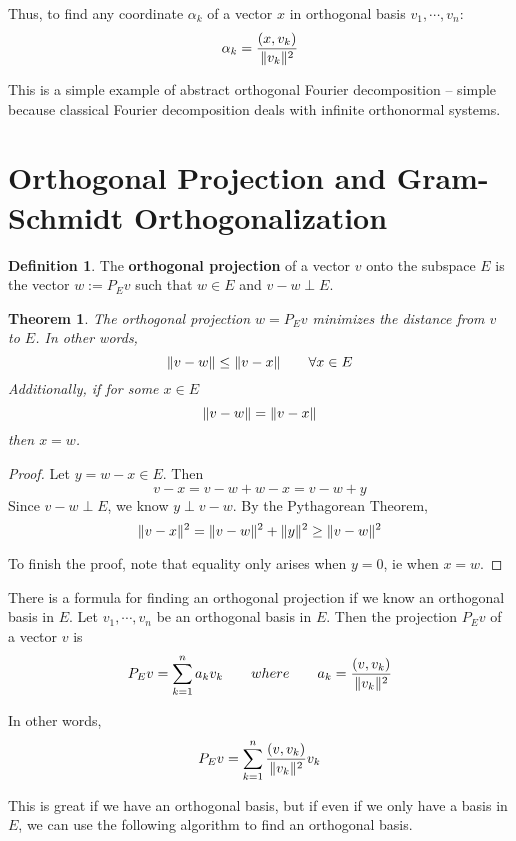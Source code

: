\documentclass[a4paper,10pt]{book}
\DeclarePairedDelimiter{\norm}{\lVert}{\rVert}
\theoremstyle{plain}
\newtheorem{theorem}{Theorem}[section]
\theoremstyle{plain}
\theoremstyle{remark}
\theoremstyle{definition}
\newtheorem{definition}{Definition}[section]
\begin{document}
Thus, to find any coordinate $\alpha_{k}$ of a vector $x$ in orthogonal basis $v_{1}, \cdots, v_{n}$: 
$$ \alpha_{k} = \frac{(x, v_{k})}{\norm{v_{k}}^{2}}$$

This is a simple example of abstract orthogonal Fourier decomposition -- simple because classical Fourier decomposition deals with infinite orthonormal systems. 

\section{Orthogonal Projection and Gram-Schmidt Orthogonalization} 

\begin{definition}
The \textbf{orthogonal projection} of a vector $v$ onto the subspace $E$ is the vector $w := P_{E} v$ such that $w \in E$ and $v - w \perp E$. 
\end{definition}

\begin{theorem}
The orthogonal projection $w = P_{E} v$ minimizes the distance from $v$ to $E$. In other words, 
$$\norm{v - w} \leq \norm{v - x} \qquad \forall x \in E$$
Additionally, if for some $x \in E$
$$\norm{v - w} = \norm{v - x}$$
then $x = w$. 
\end{theorem}

\begin{proof}
Let $y = w - x \in E$. Then 
$$v - x = v - w + w - x = v - w + y$$
Since $v - w \perp E$, we know $y \perp v - w$. By the Pythagorean Theorem, 
$$\norm{v - x}^{2} = \norm{v - w}^{2} + \norm{y}^{2} \geq \norm{v - w}^{2}$$

To finish the proof, note that equality only arises when $y = 0$, ie when $x = w$. 
\end{proof}

There is a formula for finding an orthogonal projection if we know an orthogonal basis in $E$. Let $v_{1}, \cdots, v_{n}$ be an orthogonal basis in $E$. Then the projection $P_{E} v$ of a vector $v$ is 
$$P_{E} v = \sum_{k=1}^{n} a_{k} v_{k} \qquad where \qquad a_{k} = \frac{(v, v_{k})}{\norm{v_{k}}^{2}}$$

In other words, 
$$P_{E} v = \sum_{k=1}^{n} \frac{(v, v_{k})}{\norm{v_{k}}^{2}} v_{k}$$

This is great if we have an orthogonal basis, but if even if we only have a basis in $E$, we can use the following algorithm to find an orthogonal basis. 
\end{document}
